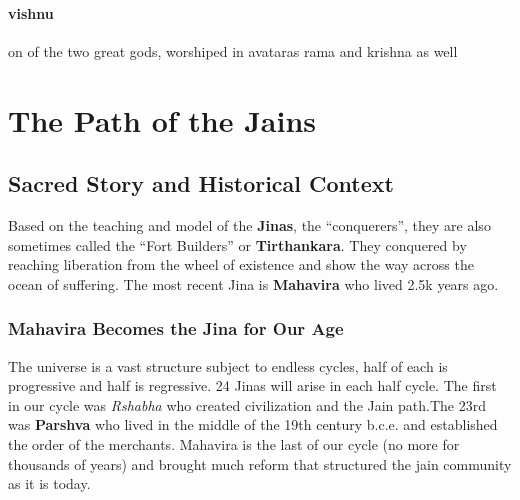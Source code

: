 \documentclass{article}
\begin{document}
\paragraph{vishnu}
\label{par:vishnu}
on of the two great gods, worshiped in avataras rama and krishna as well

\section{The Path of the Jains}
\label{sec:the_path_of_the_jains}
\subsection{Sacred Story and Historical Context}
\label{sub:sacred_story_and_historical_context}
Based on the teaching and model of the \textbf{Jinas}, the ``conquerers'', they are also sometimes called the ``Fort Builders'' or \textbf{Tirthankara}. They conquered by reaching liberation from the wheel of existence and show the way across the ocean of suffering. The most recent Jina is \textbf{Mahavira} who lived 2.5k years ago.

\subsubsection{Mahavira Becomes the Jina for Our Age}
\label{ssub:mahavira_becomes_the_jina_for_our_age}
The universe is a vast structure subject to endless cycles, half of each is progressive and half is regressive. 24 Jinas will arise in each half cycle. The first in our cycle was \emph{Rshabha} who created civilization and the Jain path.The 23rd was \textbf{Parshva} who lived in the middle of the 19th century b.c.e. and established the order of the merchants. Mahavira is the last of our cycle (no more for thousands of years) and brought much reform that structured the jain community as it is today.
\end{document}
